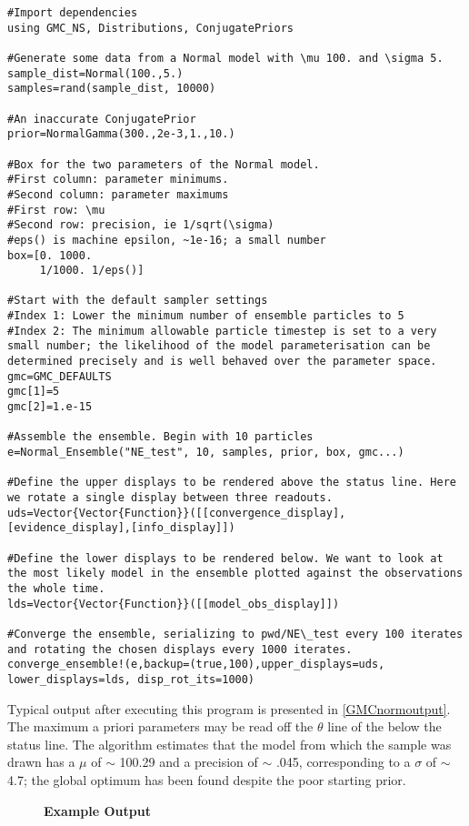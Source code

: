\begin{verbatim}
#Import dependencies
using GMC_NS, Distributions, ConjugatePriors

#Generate some data from a Normal model with \mu 100. and \sigma 5. 
sample_dist=Normal(100.,5.)
samples=rand(sample_dist, 10000)

#An inaccurate ConjugatePrior
prior=NormalGamma(300.,2e-3,1.,10.) 

#Box for the two parameters of the Normal model.
#First column: parameter minimums.
#Second column: parameter maximums
#First row: \mu
#Second row: precision, ie 1/sqrt(\sigma)
#eps() is machine epsilon, ~1e-16; a small number
box=[0. 1000.
     1/1000. 1/eps()]

#Start with the default sampler settings
#Index 1: Lower the minimum number of ensemble particles to 5
#Index 2: The minimum allowable particle timestep is set to a very small number; the likelihood of the model parameterisation can be determined precisely and is well behaved over the parameter space.
gmc=GMC_DEFAULTS
gmc[1]=5
gmc[2]=1.e-15

#Assemble the ensemble. Begin with 10 particles
e=Normal_Ensemble("NE_test", 10, samples, prior, box, gmc...)

#Define the upper displays to be rendered above the status line. Here we rotate a single display between three readouts.
uds=Vector{Vector{Function}}([[convergence_display],[evidence_display],[info_display]])

#Define the lower displays to be rendered below. We want to look at the most likely model in the ensemble plotted against the observations the whole time.
lds=Vector{Vector{Function}}([[model_obs_display]])

#Converge the ensemble, serializing to pwd/NE\_test every 100 iterates and rotating the chosen displays every 1000 iterates.
converge_ensemble!(e,backup=(true,100),upper_displays=uds, lower_displays=lds, disp_rot_its=1000)
\end{verbatim}

Typical output after executing this program is presented in \autoref{GMCnormoutput}. The maximum a priori parameters may be read off the $\theta$ line of the  below the status line. The algorithm estimates that the model from which the sample was drawn has a $\mu$ of $\sim$ 100.29 and a precision of $\sim$ .045, corresponding to a $\sigma$ of $\sim$ 4.7; the global optimum has been found despite the poor starting prior.

\begin{figure}[!h]
    \caption{{\bf Example \protect{} Output}}
    \label{GMCnormoutput}
\end{figure}